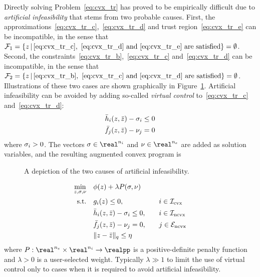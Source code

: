 \documentclass[letterpaper, 10 pt, conference]{ieeeconf}
\begin{document}
Directly solving Problem~\eqref{eq:cvx_tr} has proved to be empirically difficult due to \textit{artificial infeasibility} that stems from two probable causes. First, the approximations~\eqref{eq:cvx_tr_c},~\eqref{eq:cvx_tr_d} and trust region~\eqref{eq:cvx_tr_e} can be incompatible, in the sense that $\mathcal{F}_1 = \{z\,|\,\eqref{eq:cvx_tr_c},~\eqref{eq:cvx_tr_d}\text{ and }\eqref{eq:cvx_tr_e}\text{ are satisfied}\} = \emptyset$. 
Second, the constraints~\eqref{eq:cvx_tr_b},~\eqref{eq:cvx_tr_c} and~\eqref{eq:cvx_tr_d} can be incompatible, in the sense that $\mathcal{F}_2 = \{z\,|\,\eqref{eq:cvx_tr_b},~\eqref{eq:cvx_tr_c}\text{ and }\eqref{eq:cvx_tr_d}\text{ are satisfied}\}=\emptyset$. Illustrations of these two cases are shown graphically in Figure~\ref{fig:artificial_infeas}. Artificial infeasibility can be avoided by adding so-called \textit{virtual control} to~\eqref{eq:cvx_tr_c} and~\eqref{eq:cvx_tr_d}:
\begin{subequations}\label{eq:virtual_control}
\begin{align}
\bar{h}_i(z,\bar{z}) - \sigma_i \leq 0 \\
\bar{f}_j(z,\bar{z}) - \nu_j = 0
\end{align}
\end{subequations}
where $\sigma_i > 0$. The vectors $\vcc\in\real^{n_i}$ and $\vc\in\real^{n_e}$ are added as solution variables, and the resulting augmented convex program is%
\begin{figure}
\centering
\subfloat[$\mathcal{F}_1 = \emptyset$.]{} \hfil
\subfloat[$\mathcal{F}_2 = \emptyset$]{}
\caption{A depiction of the two causes of artificial infeasibility.}
\label{fig:artificial_infeas}
\end{figure}
\begin{subequations}\label{eq:cvx_apprx}
\begin{align}
\min_{\z,\vcc,\vc} &\quad \ocost(\z) + \lambda P(\vcc,\vc) &&\null \label{eq:cvx_apprx_a} \\
\text{s.t.} &\quad \fc_i(\z) \leq 0, &&\quad i\in\setIcvx \label{eq:cvx_apprx_b} \\
&\quad \fnib_i(\z,\zb) - \vcc_i \leq 0, &&\quad i\in\setIncvx \label{eq:cvx_apprx_c}\\
&\quad \fneb_j(\z,\zb) - \vc_j = 0, &&\quad j\in\setEncvx \label{eq:cvx_apprx_d} \\
&\quad \|\z-\zb\|_q \leq \tr &&\null  \label{eq:cvx_apprx_e}
\end{align}
\end{subequations}
where $P : \real^{n_e}\times\real^{n_i} \rightarrow \realpp$ is a positive-definite penalty function and $\lambda>0$ is a user-selected weight. Typically $\lambda \gg 1$ to limit the use of virtual control only to cases when it is required to avoid artificial infeasibility.
\end{document}
